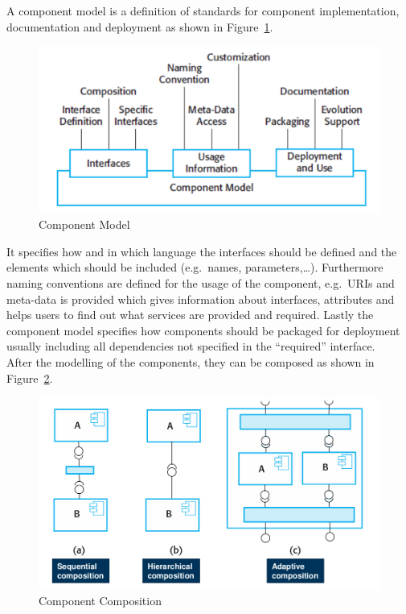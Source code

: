 A component model is a definition of standards for component implementation, documentation and deployment as shown in Figure~\ref{fig:component_model}.
\begin{figure}[h]
  \centering
  \includegraphics[width=.8\textwidth]{images/component_model.png}
  \caption{Component Model}\label{fig:component_model}
\end{figure}
It specifies how and in which language the interfaces should be defined and the elements which should be included (e.g.\ names, parameters,\ldots).
Furthermore naming conventions are defined for the usage of the component, e.g.\ URIs and meta-data is provided which gives information about interfaces, attributes and helps users to find out what services are provided and required.
Lastly the component model specifies how components should be packaged for deployment usually including all dependencies not specified in the ``required'' interface.\\

After the modelling of the components, they can be composed as shown in Figure~\ref{fig:component_composition}.
\newline

\begin{figure}[h]
  \centering
  \includegraphics[width=.7\textwidth]{images/component_composition.png}
  \caption{Component Composition}\label{fig:component_composition}
\end{figure}

